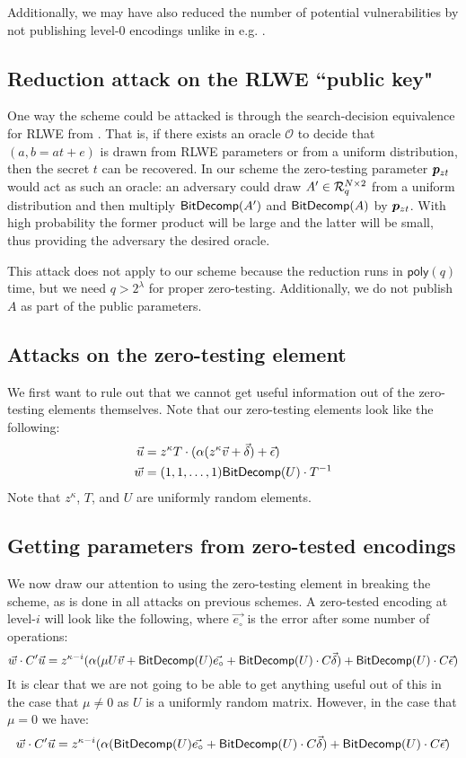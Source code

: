 Additionally, we may have also reduced the number of potential vulnerabilities by not publishing level-$0$ encodings unlike in e.g. \cite{clt}.

\subsection{Reduction attack on the RLWE ``public key"}

One way the scheme could be attacked is through the search-decision equivalence for RLWE from \cite{lpr}.  That is, if there exists an oracle $\mathcal{O}$ to decide that $(a, b = at+e)$ is drawn from RLWE parameters or from a uniform distribution, then the secret $t$ can be recovered.  In our scheme the zero-testing parameter $\bm{p}_{zt}$ would act as such an oracle: an adversary could draw $A' \in \mathcal{R}_q^{N \times 2}$ from a uniform distribution and then multiply $\mathsf{BitDecomp}(A')$ and $\mathsf{BitDecomp}(A)$ by $\bm{p}_{zt}$.  With high probability the former product will be large and the latter will be small, thus providing the adversary the desired oracle.

This attack does not apply to our scheme because the reduction runs in $\mathsf{poly}(q)$ time, but we need $q > 2^\lambda$ for proper zero-testing.  Additionally, we do not publish $A$ as part of the public parameters.

\subsection{Attacks on the zero-testing element}

We first want to rule out that we cannot get useful information out of the zero-testing elements themselves.  Note that our zero-testing elements look like the following:
\begin{align*}
\vec{u} &= z^\kappa T\cdot (\alpha (z^\kappa \vec{v} + \vec{\delta}) + \vec{\epsilon})\\
\vec{w} &= (1,1,\ldots, 1)\mathsf{BitDecomp}(U)\cdot T^{-1}
\end{align*}
Note that $z^\kappa$, $T$, and $U$ are uniformly random elements.

\subsection{Getting parameters from zero-tested encodings}

We now draw our attention to using the zero-testing element in breaking the scheme, as is done in all attacks on previous schemes.  A zero-tested encoding at level-$i$ will look like the following, where $\vec{e_{\circ}}$ is the error after some number of operations:
$$\vec{w} \cdot C' \vec{u} = z^{\kappa-i} (\alpha (\mu U \vec{v} + \mathsf{BitDecomp}(U)\vec{e_{\circ}} + \mathsf{BitDecomp}(U)\cdot C\vec{\delta}) + \mathsf{BitDecomp}(U)\cdot C\vec{\epsilon})$$
It is clear that we are not going to be able to get anything useful out of this in the case that $\mu \not= 0$ as $U$ is a uniformly random matrix.  However, in the case that $\mu = 0$ we have:
\begin{equation}\label{eq:topleveltested}
\vec{w}\cdot C'\vec{u} = z^{\kappa - i}(\alpha (\mathsf{BitDecomp}(U)\vec{e_{\circ}} + \mathsf{BitDecomp}(U)\cdot C\vec{\delta}) + \mathsf{BitDecomp}(U)\cdot C\vec{\epsilon})
\end{equation}

